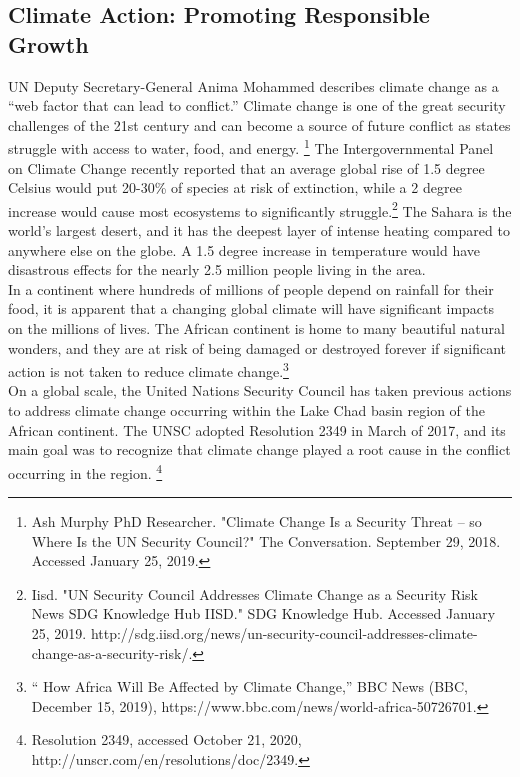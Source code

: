 \documentclass[10pt, letterpaper]{article}
\begin{document}
\subsection{Climate Action: Promoting Responsible Growth}

UN Deputy Secretary-General Anima Mohammed describes climate change as a
``web factor that can lead to conflict.'' Climate change is one of the
great security challenges of the 21st century and can become a source of
future conflict as states struggle with access to water, food, and
energy. \footnote{Ash Murphy PhD Researcher. "Climate Change Is a
  Security Threat -- so Where Is the UN Security Council?" The
  Conversation. September 29, 2018. Accessed January 25, 2019.} The
Intergovernmental Panel on Climate Change recently reported that an
average global rise of 1.5 degree Celsius would put 20-30\% of species
at risk of extinction, while a 2 degree increase would cause most
ecosystems to significantly struggle.\footnote{Iisd. "UN Security
  Council Addresses Climate Change as a Security Risk \textbar{} News
  \textbar{} SDG Knowledge Hub \textbar{} IISD." SDG Knowledge Hub.
  Accessed January 25, 2019.
  http://sdg.iisd.org/news/un-security-council-addresses-climate-change-as-a-security-risk/.}
The Sahara is the world's largest desert, and it has the deepest layer
of intense heating compared to anywhere else on the globe. A 1.5 degree
increase in temperature would have disastrous effects for the nearly 2.5
million people living in the area. \\

In a continent where hundreds of millions of people depend on rainfall
for their food, it is apparent that a changing global climate will have
significant impacts on the millions of lives. The African continent is
home to many beautiful natural wonders, and they are at risk of being
damaged or destroyed forever if significant action is not taken to
reduce climate change.\footnote{`` How Africa Will Be Affected by
  Climate Change,'' BBC News (BBC, December 15, 2019),
  https://www.bbc.com/news/world-africa-50726701.} \\

On a global scale, the United Nations Security Council has taken
previous actions to address climate change occurring within the Lake
Chad basin region of the African continent. The UNSC adopted Resolution
2349 in March of 2017, and its main goal was to recognize that climate
change played a root cause in the conflict occurring in the region.
\footnote{Resolution 2349, accessed October 21, 2020,
  http://unscr.com/en/resolutions/doc/2349.} \\
\end{document}
